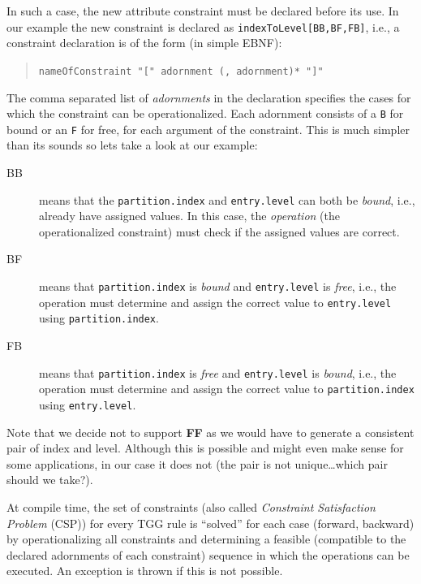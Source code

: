 In such a case, the new attribute constraint must be declared before its use. 
In our example the new constraint is declared as \texttt{indexToLevel[BB,BF,FB]}, i.e., a constraint declaration is of the form (in simple EBNF):
\begin{quote}
\texttt{nameOfConstraint "[" adornment (, adornment)* "]"}
\end{quote}
The comma separated list of \emph{adornments} in the declaration specifies the cases for which the constraint can be operationalized.
Each adornment consists of a \texttt{B} for bound or an \texttt{F} for free, for each argument of the constraint.
This is much simpler than its sounds so lets take a look at our example:
\begin{description}
\item[BB] means that the \texttt{partition.index} and \texttt{entry.level} can both be \emph{bound}, i.e., already have assigned values.
In this case, the \emph{operation} (the operationalized constraint) must check if the assigned values are correct. 
\item[BF] means that \texttt{partition.index} is \emph{bound} and \texttt{entry.level} is \emph{free}, i.e., the operation must determine and assign the correct value to \texttt{entry.level} using \texttt{partition.index}.
\item[FB] means that \texttt{partition.index} is \emph{free} and \texttt{entry.level} is \emph{bound}, i.e., the operation must determine and assign the correct value to \texttt{parti\-tion.in\-dex} using \texttt{entry.level}. 
\end{description}

Note that we decide not to support \textbf{FF} as we would have to generate a consistent pair of index and level.
Although this is possible and might even make sense for some applications, in our case it does not (the pair is not unique\ldots which pair should we take?).

At compile time, the set of constraints (also called \emph{Constraint Satisfaction Problem} (CSP)) for every TGG rule is ``solved'' for each case (forward, backward) by operationalizing all constraints and determining a feasible (compatible to the declared adornments of each constraint) sequence in which the operations can be executed.
An exception is thrown if this is not possible.
